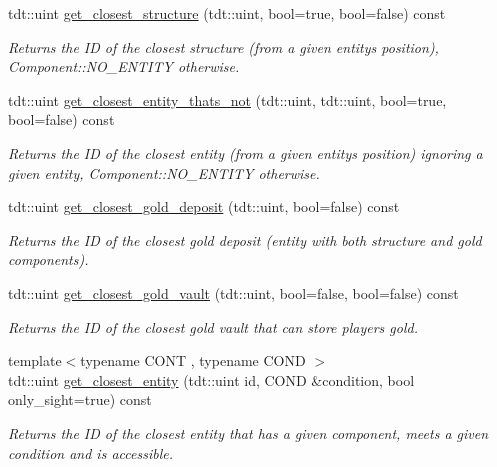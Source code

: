 \begin{DoxyCompactItemize}
tdt\+::uint \hyperlink{class_combat_system_afdb21b7f8f95c609e4c00ae6206ac942}{get\+\_\+closest\+\_\+structure} (tdt\+::uint, bool=true, bool=false) const 
\begin{DoxyCompactList}\small\item\em Returns the ID of the closest structure (from a given entity\textquotesingle{}s position), Component\+::\+N\+O\+\_\+\+E\+N\+T\+I\+TY otherwise. \end{DoxyCompactList}\item 
tdt\+::uint \hyperlink{class_combat_system_a1a2d9e90b900331d004d10e2d6e39329}{get\+\_\+closest\+\_\+entity\+\_\+thats\+\_\+not} (tdt\+::uint, tdt\+::uint, bool=true, bool=false) const 
\begin{DoxyCompactList}\small\item\em Returns the ID of the closest entity (from a given entity\textquotesingle{}s position) ignoring a given entity, Component\+::\+N\+O\+\_\+\+E\+N\+T\+I\+TY otherwise. \end{DoxyCompactList}\item 
tdt\+::uint \hyperlink{class_combat_system_a6776c78cfda064865b66b60f1a0bd6e1}{get\+\_\+closest\+\_\+gold\+\_\+deposit} (tdt\+::uint, bool=false) const 
\begin{DoxyCompactList}\small\item\em Returns the ID of the closest gold deposit (entity with both structure and gold components). \end{DoxyCompactList}\item 
tdt\+::uint \hyperlink{class_combat_system_a9b467406db2dae24848078435a78c95c}{get\+\_\+closest\+\_\+gold\+\_\+vault} (tdt\+::uint, bool=false, bool=false) const 
\begin{DoxyCompactList}\small\item\em Returns the ID of the closest gold vault that can store player\textquotesingle{}s gold. \end{DoxyCompactList}\item 
{\footnotesize template$<$typename C\+O\+NT , typename C\+O\+ND $>$ }\\tdt\+::uint \hyperlink{class_combat_system_a94734d18facf7af7172fca0d22dcad49}{get\+\_\+closest\+\_\+entity} (tdt\+::uint id, C\+O\+ND \&condition, bool only\+\_\+sight=true) const 
\begin{DoxyCompactList}\small\item\em Returns the ID of the closest entity that has a given component, meets a given condition and is accessible. \end{DoxyCompactList}\item 

\end{DoxyCompactItemize}
